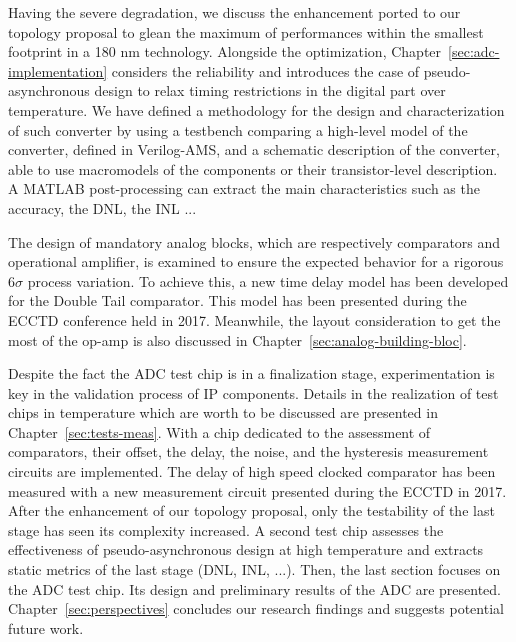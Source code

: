 Having the severe degradation, we discuss the enhancement ported to our topology proposal to glean the maximum of performances within the smallest footprint in a 180 nm technology. Alongside the optimization, Chapter~\ref{sec:adc-implementation} considers the reliability and introduces the case of pseudo-asynchronous design to relax timing restrictions in the digital part over temperature. We have defined a methodology for the design and characterization of such converter by using a testbench comparing a high-level model of the converter, defined in Verilog-AMS, and a schematic description of the converter, able to use macromodels of the components or their transistor-level description. A MATLAB post-processing can extract the main characteristics such as the accuracy, the DNL, the INL ...

The design of mandatory analog blocks, which are respectively comparators and operational amplifier, is examined to ensure the expected behavior for a rigorous 6\(\sigma\) process variation. To achieve this, a new time delay model has been developed for the Double Tail comparator. This model has been presented during the ECCTD conference held in 2017. Meanwhile, the layout consideration to get the most of the op-amp is also discussed in Chapter~\ref{sec:analog-building-bloc}.

Despite the fact the ADC test chip is in a finalization stage, experimentation is key in the validation process of IP components. Details in the realization of test chips in temperature which are worth to be discussed are presented in Chapter~\ref{sec:tests-meas}. With a chip dedicated to the assessment of comparators, their offset, the delay, the noise, and the hysteresis measurement circuits are implemented. The delay of high speed clocked comparator has been measured with a new measurement circuit presented during the ECCTD in 2017. After the enhancement of our topology proposal, only the testability of the last stage has seen its complexity increased. A second test chip assesses the effectiveness of pseudo-asynchronous design at high temperature and extracts static metrics of the last stage (DNL, INL, ...). Then, the last section focuses on the ADC test chip. Its design and preliminary results of the ADC are presented. Chapter~\ref{sec:perspectives} concludes our research findings and suggests potential future work.

